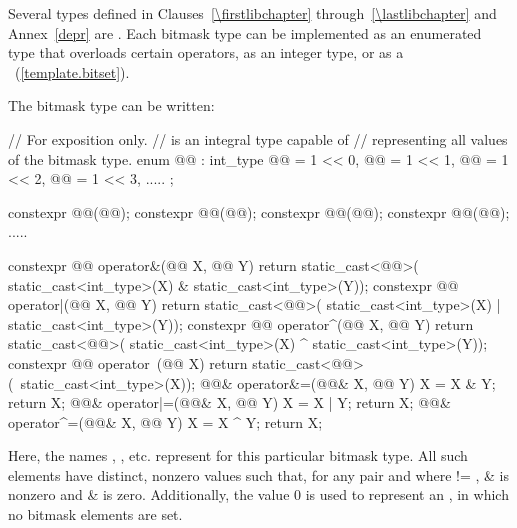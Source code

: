 \pnum
Several types defined in Clauses~\ref{\firstlibchapter} through~\ref{\lastlibchapter}
and Annex~\ref{depr} are
.
%
Each bitmask type can be implemented as an
enumerated type that overloads certain operators, as an integer type,
or as a
~(\ref{template.bitset}).
%

\pnum
The bitmask type  can be written:

\begin{codeblock}
// For exposition only.
//  is an integral type capable of
// representing all values of the bitmask type.
enum @@ : int_type {
  @@ = 1 << 0, @@ = 1 << 1, @@ = 1 << 2, @@ = 1 << 3, .....
};

constexpr @@(@@);
constexpr @@(@@);
constexpr @@(@@);
constexpr @@(@@);
  .....

constexpr @@ operator&(@@ X, @@ Y) {
  return static_cast<@@>(
    static_cast<int_type>(X) & static_cast<int_type>(Y));
}
constexpr @@ operator|(@@ X, @@ Y) {
  return static_cast<@@>(
    static_cast<int_type>(X) | static_cast<int_type>(Y));
}
constexpr @@ operator^(@@ X, @@ Y){
  return static_cast<@@>(
    static_cast<int_type>(X) ^ static_cast<int_type>(Y));
}
constexpr @@ operator~(@@ X){
  return static_cast<@@>(~static_cast<int_type>(X));
}
@@& operator&=(@@& X, @@ Y){
  X = X & Y; return X;
}
@@& operator|=(@@& X, @@ Y) {
  X = X | Y; return X;
}
@@& operator^=(@@& X, @@ Y) {
  X = X ^ Y; return X;
}
\end{codeblock}

\pnum
Here, the names , , etc. represent
for this particular bitmask type.
%
All such elements have distinct, nonzero values such that, for any pair 
and  where  != ,  \&  is nonzero and
 \&  is zero.
%
Additionally, the value 0 is used to represent an , in which no
bitmask elements are set.


